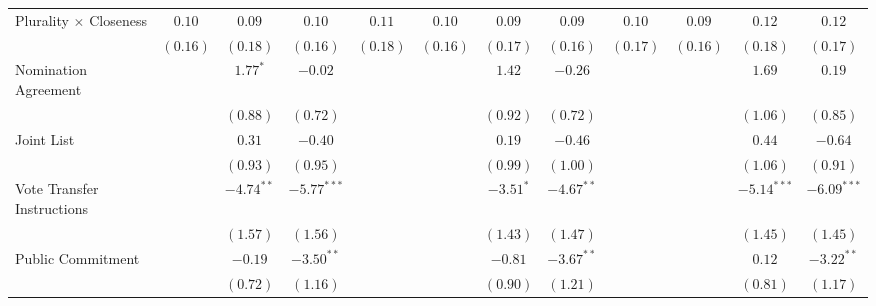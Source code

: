 \begin{sidewaystable}
\begin{center}
{\begin{tabular}{l c c c c c c c c c c c }
Plurality $\times$ Closeness                       & $0.10$       & $0.09$          & $0.10$          & $0.11$          & $0.10$       & $0.09$       & $0.09$       & $0.10$          & $0.09$       & $0.12$          & $0.12$          \\
                                                   & $(0.16)$     & $(0.18)$        & $(0.16)$        & $(0.18)$        & $(0.16)$     & $(0.17)$     & $(0.16)$     & $(0.17)$        & $(0.16)$     & $(0.18)$        & $(0.17)$        \\
Nomination Agreement                               &              & $1.77^{*}$      & $-0.02$         &                 &              & $1.42$       & $-0.26$      &                 &              & $1.69$          & $0.19$          \\
                                                   &              & $(0.88)$        & $(0.72)$        &                 &              & $(0.92)$     & $(0.72)$     &                 &              & $(1.06)$        & $(0.85)$        \\
Joint List                                         &              & $0.31$          & $-0.40$         &                 &              & $0.19$       & $-0.46$      &                 &              & $0.44$          & $-0.64$         \\
                                                   &              & $(0.93)$        & $(0.95)$        &                 &              & $(0.99)$     & $(1.00)$     &                 &              & $(1.06)$        & $(0.91)$        \\
Vote Transfer Instructions                         &              & $-4.74^{**}$    & $-5.77^{***}$   &                 &              & $-3.51^{*}$  & $-4.67^{**}$ &                 &              & $-5.14^{***}$   & $-6.09^{***}$   \\
                                                   &              & $(1.57)$        & $(1.56)$        &                 &              & $(1.43)$     & $(1.47)$     &                 &              & $(1.45)$        & $(1.45)$        \\
Public Commitment                                  &              & $-0.19$         & $-3.50^{**}$    &                 &              & $-0.81$      & $-3.67^{**}$ &                 &              & $0.12$          & $-3.22^{**}$    \\
                                                   &              & $(0.72)$        & $(1.16)$        &                 &              & $(0.90)$     & $(1.21)$     &                 &              & $(0.81)$        & $(1.17)$        \\

\end{tabular}}
\end{center}
\end{sidewaystable}
